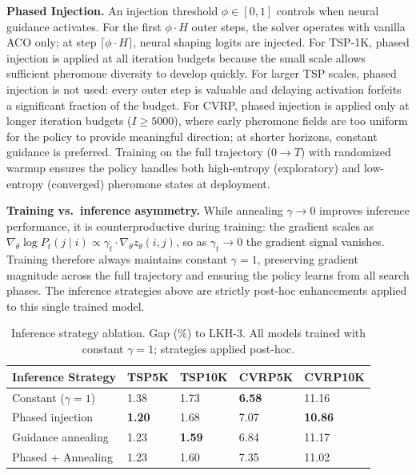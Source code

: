 \documentclass[sigconf,review]{acmart}
\begin{document}
\textbf{Phased Injection.}
An injection threshold $\phi \in [0,1]$ controls when neural guidance activates.
For the first $\phi \cdot H$ outer steps, the solver operates with vanilla ACO only; at step $\lceil\phi \cdot H\rceil$, neural shaping logits are injected.
For TSP-1K, phased injection is applied at all iteration budgets because the small scale allows sufficient pheromone diversity to develop quickly.
For larger TSP scales, phased injection is not used: every outer step is valuable and delaying activation forfeits a significant fraction of the budget.
For CVRP, phased injection is applied only at longer iteration budgets ($I{\geq}5000$), where early pheromone fields are too uniform for the policy to provide meaningful direction; at shorter horizons, constant guidance is preferred.
Training on the full trajectory ($0 \to T$) with randomized warmup ensures the policy handles both high-entropy (exploratory) and low-entropy (converged) pheromone states at deployment.

\textbf{Training vs.\ inference asymmetry.}
While annealing $\gamma \to 0$ improves inference performance, it is counterproductive during training: the gradient scales as $\nabla_\theta \log P_t(j \mid i) \propto \gamma_t \cdot \nabla_\theta z_\theta(i,j)$, so as $\gamma_t \to 0$ the gradient signal vanishes.
Training therefore always maintains constant $\gamma{=}1$, preserving gradient magnitude across the full trajectory and ensuring the policy learns from all search phases.
The inference strategies above are strictly post-hoc enhancements applied to this single trained model.

\begin{table}[h]
\centering
\caption{Inference strategy ablation. Gap (\%) to LKH-3. All models trained with constant $\gamma{=}1$; strategies applied post-hoc.}
\label{tab:ablation-inference}
\small
\begin{tabularx}{\columnwidth}{lYYYY}
\toprule
Inference Strategy & TSP5K & TSP10K & CVRP5K & CVRP10K \\
\midrule
Constant ($\gamma{=}1$)            & 1.38 & 1.73 & \textbf{6.58} & 11.16 \\
Phased injection           & \textbf{1.20} & 1.68 & 7.07 & \textbf{10.86} \\
Guidance annealing         & 1.23 & \textbf{1.59} & 6.84 & 11.17 \\
Phased + Annealing         & 1.23 & 1.60 & 7.35 & 11.02 \\
\bottomrule
\end{tabularx}
\end{table}
\end{document}

